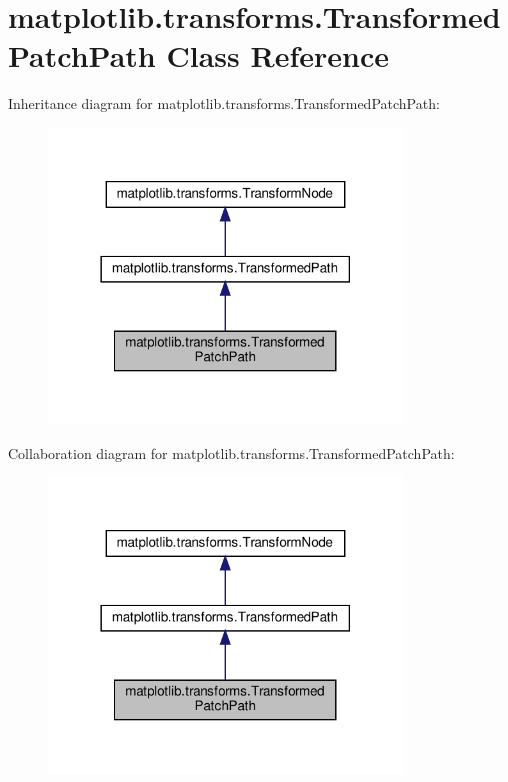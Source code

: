 \hypertarget{classmatplotlib_1_1transforms_1_1TransformedPatchPath}{}\section{matplotlib.\+transforms.\+Transformed\+Patch\+Path Class Reference}
\label{classmatplotlib_1_1transforms_1_1TransformedPatchPath}


Inheritance diagram for matplotlib.\+transforms.\+Transformed\+Patch\+Path\+:
\nopagebreak
\begin{figure}[H]
\begin{center}
\leavevmode
\includegraphics[width=266pt]{classmatplotlib_1_1transforms_1_1TransformedPatchPath__inherit__graph}
\end{center}
\end{figure}


Collaboration diagram for matplotlib.\+transforms.\+Transformed\+Patch\+Path\+:
\nopagebreak
\begin{figure}[H]
\begin{center}
\leavevmode
\includegraphics[width=266pt]{classmatplotlib_1_1transforms_1_1TransformedPatchPath__coll__graph}
\end{center}
\end{figure}
